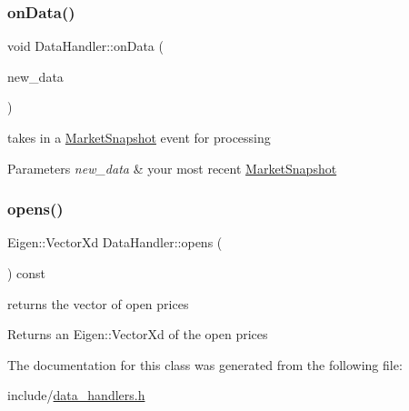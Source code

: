 \subsubsection{\texorpdfstring{on\+Data()}{onData()}}
{\footnotesize\ttfamily void Data\+Handler\+::on\+Data (\begin{DoxyParamCaption}\item[{const \hyperlink{classMarketSnapshot}{Market\+Snapshot} \&}]{new\+\_\+data }\end{DoxyParamCaption})}



takes in a \hyperlink{classMarketSnapshot}{Market\+Snapshot} event for processing 


\begin{DoxyParams}{Parameters}
{\em new\+\_\+data} & your most recent \hyperlink{classMarketSnapshot}{Market\+Snapshot} \\
\hline
\end{DoxyParams}
\mbox{\label{classDataHandler_a56ff111f68c862739bd94c193abdf400}} 
\subsubsection{\texorpdfstring{opens()}{opens()}}
{\footnotesize\ttfamily Eigen\+::\+Vector\+Xd Data\+Handler\+::opens (\begin{DoxyParamCaption}{ }\end{DoxyParamCaption}) const}



returns the vector of open prices 

\begin{DoxyReturn}{Returns}
an Eigen\+::\+Vector\+Xd of the open prices 
\end{DoxyReturn}


The documentation for this class was generated from the following file\+:\begin{DoxyCompactItemize}
\item 
include/\hyperlink{data__handlers_8h}{data\+\_\+handlers.\+h}\end{DoxyCompactItemize}
